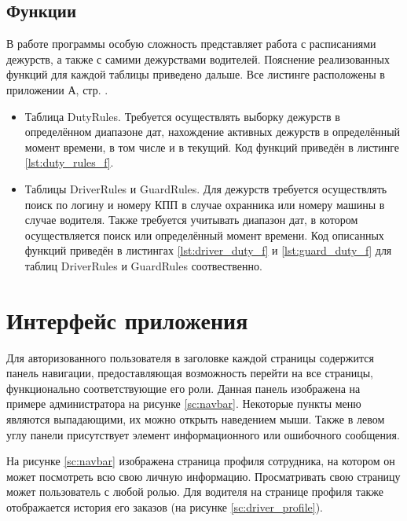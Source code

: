 \subsection{Функции}
В работе программы особую сложность представляет работа с расписаниями дежурств, а также с самими дежурствами водителей. Пояснение реализованных функций для каждой таблицы приведено дальше. Все листинге расположены в приложении А, стр. \pageref{attachmentA}.
\begin{itemize}
	\item Таблица DutyRules. Требуется осуществлять выборку дежурств в определённом диапазоне дат, нахождение активных дежурств в определённый момент времени, в том числе и в текущий. Код функций приведён в листинге \ref{lst:duty_rules_f}.
	\item Таблицы DriverRules и GuardRules. Для дежурств требуется осуществлять поиск по логину и номеру КПП в случае охранника или номеру машины в случае водителя. Также требуется учитывать диапазон дат, в котором осуществляется поиск или определённый момент времени. Код описанных функций приведён в листингах \ref{lst:driver_duty_f} и \ref{lst:guard_duty_f} для таблиц DriverRules и GuardRules соотвественно.
\end{itemize}

\newpage
\section{Интерфейс приложения}
Для авторизованного пользователя в заголовке каждой страницы содержится панель навигации, предоставляющая возможность перейти на все страницы, функционально соответствующие его роли. Данная панель изображена на примере администратора на рисунке \ref{sc:navbar}. Некоторые пункты меню являются выпадающими, их можно открыть наведением мыши. Также в левом углу панели присутствует элемент информационного или ошибочного сообщения.

На рисунке \ref{sc:navbar} изображена страница профиля сотрудника, на котором он может посмотреть всю свою личную информацию. Просматривать свою страницу может пользователь с любой ролью. Для водителя на странице профиля также отображается история его заказов (на рисунке \ref{sc:driver_profile}).


